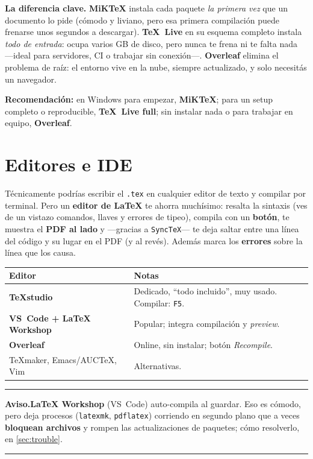 \documentclass[11pt,a4paper]{article}
\newenvironment{nota}{\par\smallskip\noindent\begin{center}%
  \begin{minipage}{0.95\linewidth}\small\rule{\linewidth}{0.4pt}\par\nobreak}%
  {\par\rule{\linewidth}{0.4pt}\end{minipage}\end{center}\smallskip}
\begin{document}
\noindent\textbf{La diferencia clave.} \textbf{MiKTeX} instala cada paquete
\emph{la primera vez} que un documento lo pide (cómodo y liviano, pero esa
primera compilación puede frenarse unos segundos a descargar). \textbf{TeX~Live}
en su esquema completo instala \emph{todo de entrada}: ocupa varios GB de disco,
pero nunca te frena ni te falta nada —ideal para servidores, CI o trabajar sin
conexión—. \textbf{Overleaf} elimina el problema de raíz: el entorno vive en la
nube, siempre actualizado, y solo necesitás un navegador.

\noindent\textbf{Recomendación:} en Windows para empezar, \textbf{MiKTeX}; para un
setup completo o reproducible, \textbf{TeX~Live full}; sin instalar nada o para
trabajar en equipo, \textbf{Overleaf}.

\section{Editores e IDE}
Técnicamente podrías escribir el \texttt{.tex} en cualquier editor de texto y
compilar por terminal. Pero un \textbf{editor de \LaTeX} te ahorra muchísimo:
resalta la sintaxis (ves de un vistazo comandos, llaves y errores de tipeo),
compila con un \textbf{botón}, te muestra el \textbf{PDF al lado} y —gracias a
\texttt{SyncTeX}— te deja saltar entre una línea del código y su lugar en el PDF
(y al revés). Además marca los \textbf{errores} sobre la línea que los causa.

\begin{center}\small
\renewcommand{\arraystretch}{1.3}
\begin{tabularx}{\linewidth}{@{}l X@{}}
\toprule
\textbf{Editor} & \textbf{Notas} \\
\midrule
\textbf{TeXstudio} & Dedicado, \enquote{todo incluido}, muy usado. Compilar: \texttt{F5}. \\
\textbf{VS~Code + LaTeX Workshop} & Popular; integra compilación y \emph{preview}. \\
\textbf{Overleaf} & Online, sin instalar; botón \emph{Recompile}. \\
TeXmaker, Emacs/AUCTeX, Vim & Alternativas. \\
\bottomrule
\end{tabularx}
\end{center}

\begin{nota}
\textbf{Aviso.}\enspace \textbf{LaTeX Workshop} (VS~Code) auto-compila al guardar.
Eso es cómodo, pero deja procesos (\texttt{latexmk}, \texttt{pdflatex}) corriendo
en segundo plano que a veces \textbf{bloquean archivos} y rompen las
actualizaciones de paquetes; cómo resolverlo, en \cref{sec:trouble}.
\end{nota}
\end{document}
